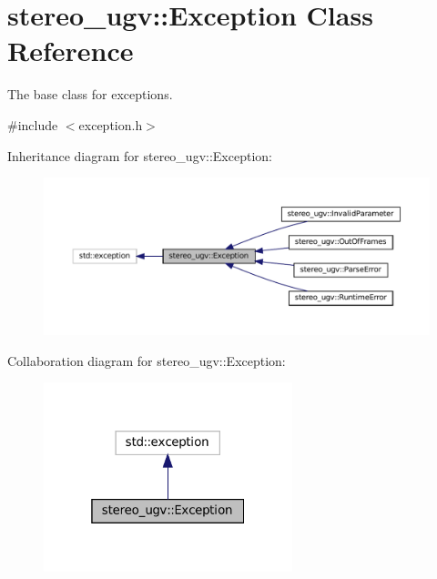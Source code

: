 \hypertarget{classstereo__ugv_1_1Exception}{}\section{stereo\+\_\+ugv\+:\+:Exception Class Reference}
\label{classstereo__ugv_1_1Exception}


The base class for exceptions.  




{\ttfamily \#include $<$exception.\+h$>$}



Inheritance diagram for stereo\+\_\+ugv\+:\+:Exception\+:\nopagebreak
\begin{figure}[H]
\begin{center}
\leavevmode
\includegraphics[width=350pt]{classstereo__ugv_1_1Exception__inherit__graph}
\end{center}
\end{figure}


Collaboration diagram for stereo\+\_\+ugv\+:\+:Exception\+:\nopagebreak
\begin{figure}[H]
\begin{center}
\leavevmode
\includegraphics[width=205pt]{classstereo__ugv_1_1Exception__coll__graph}
\end{center}
\end{figure}
